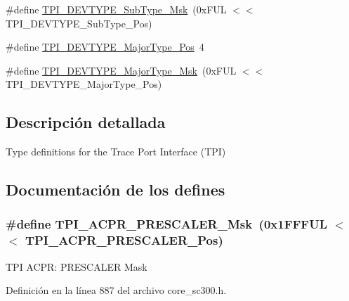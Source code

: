 \begin{DoxyCompactItemize}
\#define \hyperlink{group___c_m_s_i_s___t_p_i_ga5b2fd7dddaf5f64855d9c0696acd65c1}{T\+P\+I\+\_\+\+D\+E\+V\+T\+Y\+P\+E\+\_\+\+Sub\+Type\+\_\+\+Msk}~(0x\+F\+U\+L $<$$<$ T\+P\+I\+\_\+\+D\+E\+V\+T\+Y\+P\+E\+\_\+\+Sub\+Type\+\_\+\+Pos)
\item 
\#define \hyperlink{group___c_m_s_i_s___t_p_i_ga69c4892d332755a9f64c1680497cebdd}{T\+P\+I\+\_\+\+D\+E\+V\+T\+Y\+P\+E\+\_\+\+Major\+Type\+\_\+\+Pos}~4
\item 
\#define \hyperlink{group___c_m_s_i_s___t_p_i_gaecbceed6d08ec586403b37ad47b38c88}{T\+P\+I\+\_\+\+D\+E\+V\+T\+Y\+P\+E\+\_\+\+Major\+Type\+\_\+\+Msk}~(0x\+F\+U\+L $<$$<$ T\+P\+I\+\_\+\+D\+E\+V\+T\+Y\+P\+E\+\_\+\+Major\+Type\+\_\+\+Pos)
\end{DoxyCompactItemize}


\subsection{Descripción detallada}
Type definitions for the Trace Port Interface (T\+PI) 



\subsection{Documentación de los \textquotesingle{}defines\textquotesingle{}}
\subsubsection[{\texorpdfstring{T\+P\+I\+\_\+\+A\+C\+P\+R\+\_\+\+P\+R\+E\+S\+C\+A\+L\+E\+R\+\_\+\+Msk}{TPI_ACPR_PRESCALER_Msk}}]{\setlength{\rightskip}{0pt plus 5cm}\#define T\+P\+I\+\_\+\+A\+C\+P\+R\+\_\+\+P\+R\+E\+S\+C\+A\+L\+E\+R\+\_\+\+Msk~(0x1\+F\+F\+F\+U\+L $<$$<$ T\+P\+I\+\_\+\+A\+C\+P\+R\+\_\+\+P\+R\+E\+S\+C\+A\+L\+E\+R\+\_\+\+Pos)}\hypertarget{group___c_m_s_i_s___t_p_i_ga4fcacd27208419929921aec8457a8c13}{}\label{group___c_m_s_i_s___t_p_i_ga4fcacd27208419929921aec8457a8c13}
T\+PI A\+C\+PR\+: P\+R\+E\+S\+C\+A\+L\+ER Mask 

Definición en la línea 887 del archivo core\+\_\+sc300.\+h.

